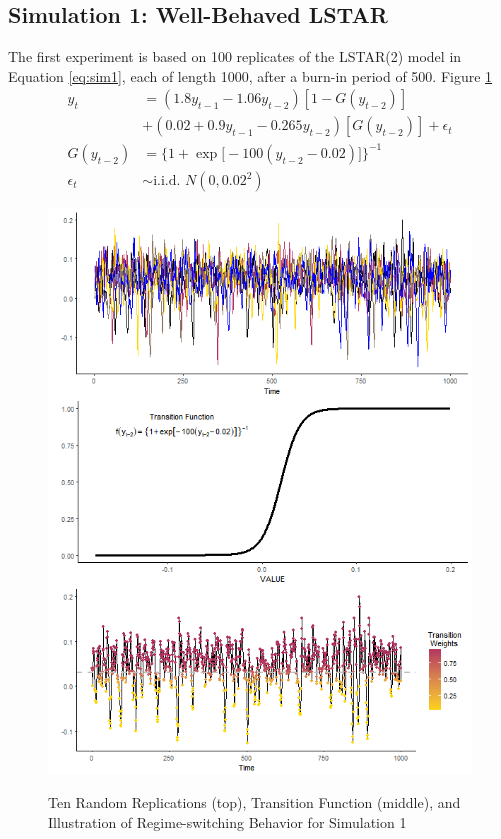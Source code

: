 \vskip 3mm

\subsection{Simulation 1: Well-Behaved LSTAR}

The first experiment is based on 100 replicates of the LSTAR(2) model in Equation \ref{eq:sim1}, each of length 1000, after a burn-in period of 500. Figure \ref{fig:sim1plots} 
\begin{equation}
	\begin{split}
		\label{eq:sim1}
		y_t&=(1.8y_{t-1}-1.06y_{t-2})[1-G(y_{t-2})]\\ 
		&+ (0.02+0.9y_{t-1}-0.265y_{t-2})[G(y_{t-2})]+\epsilon_t\\
		G(y_{t-2})&=\bigg\{1+\exp\big[-100(y_{t-2}-0.02)\big]\bigg\}^{-1}\\
		\epsilon_t &\sim \textrm{i.i.d. }  N(0,0.02^2)
	\end{split}
\end{equation}

\begin{figure}
	\centering
	\caption{Ten Random Replications (top), Transition Function (middle), and Illustration of Regime-switching Behavior  for Simulation 1 }
	\includegraphics[scale=.7]{sim1plots}
	\label{fig:sim1plots}
\end{figure}

